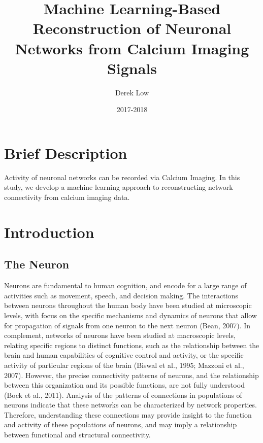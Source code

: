 \documentclass[11pt]{article}
\title{Machine Learning-Based Reconstruction of Neuronal Networks from Calcium Imaging Signals}
\author{Derek Low}
\date{2017-2018}
\begin{document}
\maketitle

\section{Brief Description}
Activity of neuronal networks can be recorded via Calcium Imaging. In this study, we develop a machine learning approach to reconstructing network connectivity from calcium imaging data.

\section{Introduction}

\subsection{The Neuron}
Neurons are fundamental to human cognition, and encode for a large range of activities such as movement, speech, and decision making. The interactions between neurons throughout the human body have been studied at microscopic levels, with focus on the specific mechanisms and dynamics of neurons that allow for propagation of signals from one neuron to the next neuron (Bean, 2007). In complement, networks of neurons have been studied at macroscopic levels, relating specific regions to distinct functions, such as the relationship between the brain and human capabilities of cognitive control and activity, or the specific activity of particular regions of the brain (Biswal et al., 1995; Mazzoni et al., 2007). However, the precise connectivity patterns of neurons, and the relationship between this organization and its possible functions, are not fully understood (Bock et al., 2011). Analysis of the patterns of connections in populations of neurons indicate that these networks can be characterized by network properties. Therefore, understanding these connections may provide insight to the function and activity of these populations of neurons, and may imply a relationship between functional and structural connectivity.\par
\end{document}
